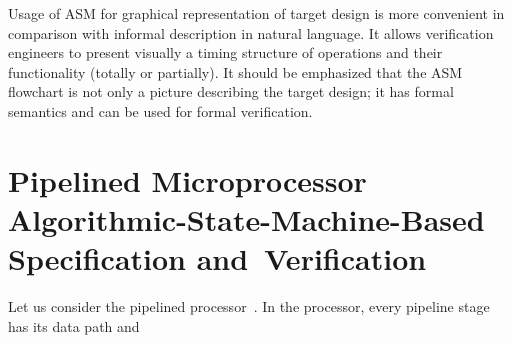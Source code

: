 \begin{multicols}{2}
Usage of ASM for graphical representation of target design is more convenient in comparison 
with informal description in natural language. It allows verification engineers to present visually a 
timing structure of operations and their functionality (totally or partially). It should be emphasized 
that the ASM flowchart is not only a picture describing the target design; it has formal semantics 
and can be used for formal verification.


\vspace*{-6pt}

\section{Pipelined Microprocessor Algorithmic-State-Machine-Based Specification and~Verification}

\vspace*{-3pt}

\noindent
Let us consider the pipelined processor~\cite{7fr}. In the processor, every pipeline stage 
has its data path and\linebreak\vspace*{-12pt}
\pagebreak

\end{multicols}

\begin{figure} %
\vspace*{1pt}
\begin{center}
\mbox{%
\epsfxsize=165.752mm
}
\end{center}
\vspace*{-9pt}
\vspace*{-6pt}
\end{figure}

